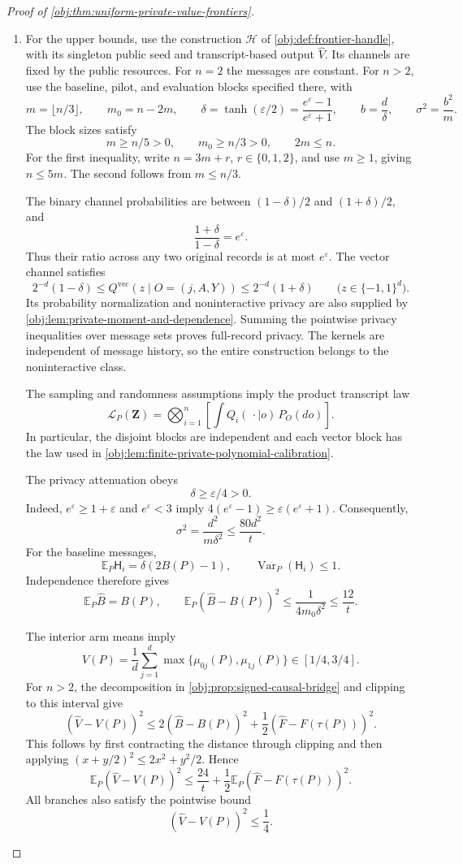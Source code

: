 \documentclass[11pt]{article}
\begin{document}
\begin{proof}[Proof of \cref{obj:thm:uniform-private-value-frontiers}]
\begin{enumerate}
\item
For the upper bounds, use the construction \(\mathscr H\) of
\cref{obj:def:frontier-handle}, with its singleton public seed and transcript-based output \(\widehat V\). Its channels are fixed by the public resources. For \(n=2\) the messages are constant. For \(n>2\), use the baseline, pilot, and evaluation blocks specified there, with
\[
m=\lfloor n/3\rfloor,\qquad m_0=n-2m,\qquad
\delta=\tanh(\varepsilon/2)=\frac{e^\varepsilon-1}{e^\varepsilon+1},
\qquad b=\frac d\delta,\qquad \sigma^2=\frac{b^2}{m}.
\]
The block sizes satisfy
\[
m\ge n/5>0,\qquad m_0\ge n/3>0,\qquad 2m\le n.
\]
For the first inequality, write \(n=3m+r\), \(r\in\{0,1,2\}\), and use \(m\ge1\), giving \(n\le5m\). The second follows from \(m\le n/3\).

The binary channel probabilities are between \((1-\delta)/2\) and
\((1+\delta)/2\), and
\[
\frac{1+\delta}{1-\delta}=e^\varepsilon.
\]
Thus their ratio across any two original records is at most
\(e^\varepsilon\). The vector channel satisfies
\[
2^{-d}(1-\delta)
\le Q^{\mathrm{vec}}(z\mid O=(j,A,Y))
\le 2^{-d}(1+\delta)
\qquad\bigl(z\in\{-1,1\}^d\bigr).
\]
Its probability normalization and noninteractive privacy are also supplied by
\cref{obj:lem:private-moment-and-dependence}. Summing the pointwise privacy inequalities over message sets proves full-record privacy. The kernels are independent of message history, so the entire construction belongs to the noninteractive class.

The sampling and randomness assumptions imply the product transcript law
\[
\mathcal L_P(\mathbf Z)
=\bigotimes_{i=1}^n
\left[\int Q_i(\,\cdot\mid o)\,P_O(do)\right].
\]
In particular, the disjoint blocks are independent and each vector block has the law used in \cref{obj:lem:finite-private-polynomial-calibration}.

The privacy attenuation obeys
\[
\delta\ge\varepsilon/4>0.
\]
Indeed, \(e^\varepsilon\ge1+\varepsilon\) and \(e^\varepsilon<3\) imply
\(4(e^\varepsilon-1)\ge\varepsilon(e^\varepsilon+1)\).
Consequently,
\[
\sigma^2=\frac{d^2}{m\delta^2}\le\frac{80d^2}{t}.
\]
For the baseline messages,
\[
\mathbb E_P\mathsf H_i=\delta(2B(P)-1),
\qquad
\operatorname{Var}_P(\mathsf H_i)\le1.
\]
Independence therefore gives
\[
\mathbb E_P\widehat B=B(P),
\qquad
\mathbb E_P(\widehat B-B(P))^2
\le\frac1{4m_0\delta^2}\le\frac{12}{t}.
\]

The interior arm means imply
\[
V(P)=\frac1d\sum_{j=1}^d
       \max\{\mu_{0j}(P),\mu_{1j}(P)\}\in[1/4,3/4].
\]
For \(n>2\), the decomposition in \cref{obj:prop:signed-causal-bridge} and clipping to this interval give
\[
(\widehat V-V(P))^2
\le2(\widehat B-B(P))^2
   +\frac12(\widehat F-F(\tau(P)))^2.
\]
This follows by first contracting the distance through clipping and then applying
\((x+y/2)^2\le2x^2+y^2/2\).
Hence
\[
\mathbb E_P(\widehat V-V(P))^2
\le\frac{24}{t}
+\frac12\mathbb E_P(\widehat F-F(\tau(P)))^2.
\]
All branches also satisfy the pointwise bound
\[
(\widehat V-V(P))^2\le\frac14.
\]


\end{enumerate}
\end{proof}
\end{document}

